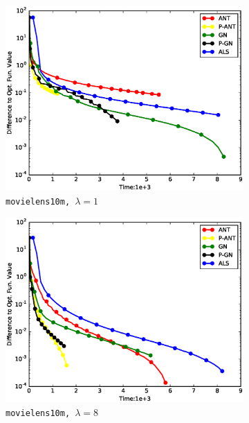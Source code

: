 \documentclass[11pt,twoside]{article}
\begin{document}
\iffalse
\begin{figure}
    \centering
    \begin{subfigure}[b]{0.32\textwidth}
        \centering
        \includegraphics[width=1.03\textwidth]{./figures/ml.1.obj.eps}
        \caption{\tt movielens10m, $\lambda=1$}
    \end{subfigure}
    \begin{subfigure}[b]{0.32\textwidth}
        \centering
        \includegraphics[width=1.03\textwidth]{./figures/ml.8.obj.eps}
        \caption{\tt movielens10m, $\lambda=8$}
    \end{subfigure}
     \begin{subfigure}[b]{0.32\textwidth}

\end{subfigure}
\end{figure}
\end{document}
